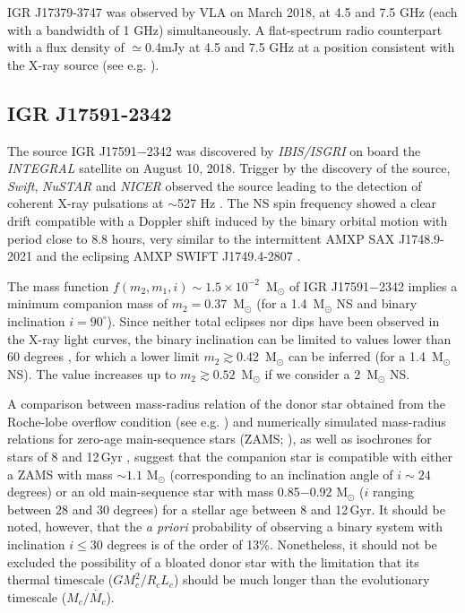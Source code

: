 \documentclass[graybox]{svmult}
\def \inte {{\em INTEGRAL\xspace}}
\def \ibis  {{\em IBIS/ISGRI\xspace}}
\def \swift {{\em Swift\xspace}}
\def \igrsev{{IGR J17591$-$2342\xspace}}
\def \nustar{{\em NuSTAR\xspace}}
\def \nicer{{\em NICER\xspace}}
\begin{document}
IGR J17379-3747 was observed by VLA on March 2018, at 4.5 and 7.5 GHz (each with a bandwidth of 1 GHz) simultaneously. A flat-spectrum radio counterpart with a flux density of $\simeq0.4$mJy at 4.5 and 7.5 GHz at a position consistent with the X-ray source (see e.g. \cite{vandenEijnden2018b}). 

\subsection{IGR J17591-2342}
The source \igrsev{} was discovered by \ibis{} on board the \inte{} satellite on August 10, 2018. Trigger by the discovery of the source, \swift{}, \nustar{} and \nicer{} observed the source leading to the detection of coherent X-ray pulsations at $\sim$527 Hz \cite{Sanna2018c}. The NS spin frequency showed a clear drift compatible with a Doppler shift induced by the binary orbital motion with period close to 8.8 hours, very similar to the intermittent AMXP SAX J1748.9-2021 \cite{Altamirano2008} and the eclipsing AMXP SWIFT J1749.4-2807 \cite{Markwardt2010b,Altamirano2011, Ferrigno2011}.

The mass function $f(m_2, m_1, i)\sim1.5 \times 10^{-2}$~M$_{\odot}$ of \igrsev{} implies a minimum companion mass of $m_2=0.37$~M$_{\odot}$ (for a 1.4~M$_{\odot}$ NS and binary inclination $i=90^{\circ}$). Since neither total eclipses nor dips have been observed in the X-ray light curves, the binary inclination can be limited to values lower than 60 degrees %
\cite{Frank2002}, for which a lower limit $m_2 \gtrsim $0.42~M$_{\odot}$ can be inferred (for a 1.4~M$_{\odot}$ NS). The value increases up to $m_2 \gtrsim 0.52$~M$_{\odot}$ if we consider a 2~M$_{\odot}$ NS. 

A comparison between mass-radius relation of the donor star obtained from the Roche-lobe overflow condition (see e.g. \cite{Sanna2018c}) and numerically simulated mass-radius relations for zero-age main-sequence stars (ZAMS; \cite{Tout1996}), as well as isochrones for stars of 8 and 12\,Gyr \cite{Girardi2000}, suggest that the companion star is compatible with either a ZAMS with mass $\sim1.1$ M$_\odot$ (corresponding to an inclination angle of $i\sim24$ degrees) or an old main-sequence star with mass 0.85$-$0.92 M$_\odot$ ($i$ ranging between $28$ and $30$ degrees) for a stellar age between 8 and 12\,Gyr. It should be noted, however, that the \textit{\textup{a priori}} probability of observing a binary system with inclination $i\leq 30$ degrees is of the order of 13\%. Nonetheless, it should not be excluded the possibility of a bloated donor star with the limitation that its thermal timescale ($GM^2_c/R_c L_c$) should be much longer than the evolutionary timescale ($M_c/\dot{M_c}$).
\end{document}
